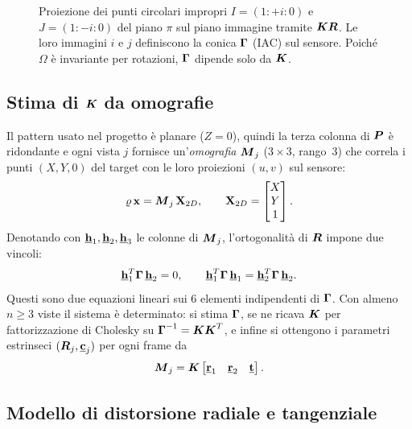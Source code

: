 \begin{figure}[H]
\caption{Proiezione dei punti circolari impropri \(I=(1:+i:0)\) e
         \(J=(1:-i:0)\) del piano \(\pi\) sul piano immagine tramite
         \(\boldsymbol{K}\boldsymbol{R}\). Le loro immagini \(i\) e \(j\) definiscono
         la conica \(\boldsymbol{\Gamma}\) (IAC) sul sensore. Poiché \(\Omega\)
         è invariante per rotazioni, \(\boldsymbol{\Gamma}\) dipende solo da \(\boldsymbol{K}\).}
\label{fig:IAC_proiezione}
\end{figure}

\subsection{Stima di \(\boldsymbol{K}\) da omografie}
\label{sub:stima_K}

Il pattern usato nel progetto è planare (\(Z=0\)), quindi la terza
colonna di \(\boldsymbol{P}\) è ridondante e ogni vista \(j\) fornisce
un'\emph{omografia} \(\boldsymbol{M}_j\) (\(3\times3\), rango~3) che
correla i punti \((X,Y,0)\) del target con le loro proiezioni
\((u,v)\) sul sensore:
\[
  \varrho\,\mathbf{x} = \boldsymbol{M}_j\,\mathbf{X}_{2D},
  \qquad
  \mathbf{X}_{2D} = \begin{bmatrix} X \\ Y \\ 1 \end{bmatrix}.
\]
Denotando con \(\underline{\mathbf{h}}_1, \underline{\mathbf{h}}_2, \underline{\mathbf{h}}_3\) le colonne
di \(\boldsymbol{M}_j\), l'ortogonalità di \(\boldsymbol{R}\) impone due vincoli:
\[
  \underline{\mathbf{h}}_1^T \boldsymbol{\Gamma}\, \underline{\mathbf{h}}_2 = 0,
  \qquad
  \underline{\mathbf{h}}_1^T \boldsymbol{\Gamma}\, \underline{\mathbf{h}}_1
  = \underline{\mathbf{h}}_2^T \boldsymbol{\Gamma}\, \underline{\mathbf{h}}_2.
\]
Questi sono due equazioni lineari sui 6 elementi indipendenti di
\(\boldsymbol{\Gamma}\). Con almeno \(n\geq3\) viste il sistema è
determinato: si stima \(\boldsymbol{\Gamma}\), se ne ricava \(\boldsymbol{K}\)
per fattorizzazione di Cholesky su
\(\boldsymbol{\Gamma}^{-1} = \boldsymbol{K}\boldsymbol{K}^T\), e infine si ottengono
i parametri estrinseci \((\boldsymbol{R}_j, \underline{\mathbf{c}}_j)\) per ogni frame
da
\[
  \boldsymbol{M}_j = \boldsymbol{K}
  \begin{bmatrix} \underline{\mathbf{r}}_1 & \underline{\mathbf{r}}_2 & \underline{\mathbf{t}} \end{bmatrix}.
\]

\subsection{Modello di distorsione radiale e tangenziale}

